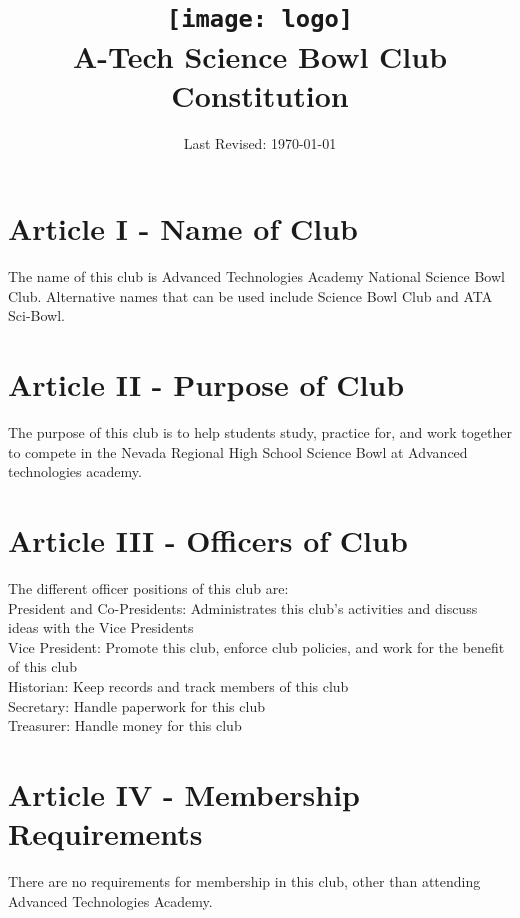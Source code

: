 \documentclass[a4, 12p]{article}
\begin{document}
\title{\texttt{[image: logo]}\\
A-Tech Science Bowl Club\\
  Constitution}
\date{Last Revised: \today}

\maketitle

\section*{Article I - Name of Club}
The name of this club is Advanced Technologies Academy National Science Bowl Club. Alternative names that can be used include Science Bowl Club and ATA Sci-Bowl.

\section*{Article II - Purpose of Club}
The purpose of this club is to help students study, practice for, and work together to compete in the Nevada Regional High School Science Bowl at Advanced technologies academy.

\newpage

\section*{Article III - Officers of Club}
The different officer positions of this club are:\\

President and Co-Presidents: Administrates this club's activities and discuss ideas with the Vice Presidents\\

Vice President: Promote this club, enforce club policies, and work for the benefit of this club\\

Historian: Keep records and track members of this club\\

Secretary: Handle paperwork for this club\\

Treasurer: Handle money for this club\\

\section*{Article IV - Membership Requirements}
There are no requirements for membership in this club, other than attending Advanced Technologies Academy.
\end{document}
